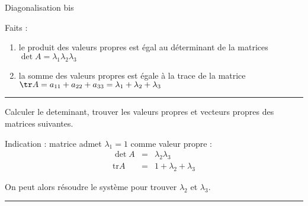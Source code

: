 \documentclass{article}
\begin{document}
\begin{center}
{\Large Diagonalisation bis}
\end{center}


\noindent
Faits :
\begin{enumerate}
	\item le produit des valeurs propres est \'egal au
		d\'eterminant de la matrices $\det A =
		\lambda_1 \lambda_2 \lambda_3$
	\item la somme des valeurs propres est \'egale à la trace de la matrice $\tr A = a_{11}  + a_{22} + a_{33} = \lambda_1 + \lambda_2 + \lambda_3$

\end{enumerate}

\vspace{1cm}
\hrule
\vspace{1cm}
\vspace{1cm}
\noindent
Calculer le deteminant, trouver les valeurs propres et vecteurs propres des matrices suivantes.

Indication : matrice admet $\lambda_1 = 1$ comme valeur propre : 
\begin{eqnarray}
 \det A&=&  \lambda_2 \lambda_3 \\ 
 \mathrm{tr} A &=& 1 + \lambda_2 + \lambda_3
\end{eqnarray}

On peut alors r\'esoudre le syst\`eme 
pour trouver $\lambda_2$ et $\lambda_3$.

\vspace{1cm}
\hrule
\vspace{1cm}
\end{document}
